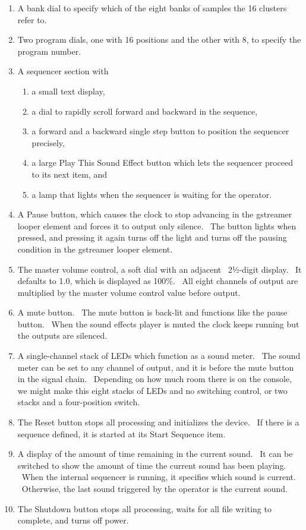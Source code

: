 \documentclass[letterpaper]{article}
\newcommand\liststyleLxxii{%
\renewcommand\theenumi{\arabic{enumi}}
\renewcommand\theenumii{\arabic{enumii}}
\renewcommand\theenumiii{\arabic{enumiii}}
\renewcommand\theenumiv{\arabic{enumiv}}
\renewcommand\labelenumi{\theenumi.}
\renewcommand\labelenumii{\theenumii.}
\renewcommand\labelenumiii{\theenumiii.}
\renewcommand\labelenumiv{\theenumiv.}
}
\begin{document}
\liststyleLxxii
\begin{enumerate}
\item A bank dial to specify which of the eight banks of samples the 16
clusters refer to. \ 
\item Two program dials, one with 16 positions and the other with 8, to
specify the program number. 
\item A sequencer section with

\begin{enumerate}
\item a small text display, 
\item a dial to rapidly scroll forward and backward in the sequence, 
\item a forward and a backward single step button to position the
sequencer precisely, 
\item a large Play This Sound Effect button which lets the sequencer
proceed to its next item, and
\item a lamp that lights when the sequencer is waiting for the operator.

\end{enumerate}
\item A Pause button, which causes the clock to stop advancing in the
gstreamer looper element and forces it to output only silence. \ The
button lights when pressed, and pressing it again turns off the light
and turns off the pausing condition in the gstreamer looper element.
\item The master volume control, a soft dial with an adjacent
\ 2½{}-digit display. \ It defaults to 1.0, which is displayed as
100\%. \ All eight channels of output are multiplied by the master
volume control value before output.
\item A mute button. \ The mute button is back-lit and functions like
the pause button. \ When the sound effects player is muted the clock
keeps running but the outputs are silenced.
\item A single-channel stack of LEDs which function as a sound meter.
\ The sound meter can be set to any channel of output, and it is before
the mute button in the signal chain. \ Depending on how much room there
is on the console, we might make this eight stacks of LEDs and no
switching control, or two stacks and a four-position switch.
\item The Reset button stops all processing and initializes the device.
\ If there is a sequence defined, it is started at its Start Sequence
item.
\item A display of the amount of time remaining in the current sound.
\ It can be switched to show the amount of time the current sound has
been playing. \ When the internal sequencer is running, it specifies
which sound is current. \ Otherwise, the last sound triggered by the
operator is the current sound.
\item The Shutdown button stops all processing, waits for all file
writing to complete, and turns off power.
\end{enumerate}
\end{document}
